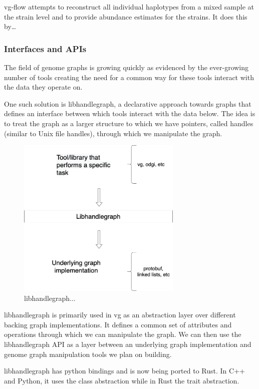 \documentclass[a4paper]{article}
\begin{document}
vg-flow \cite{baaijensStrainawareAssemblyGenomes2020} attempts to reconstruct all 
individual haplotypes from a mixed sample at the strain level and to provide
abundance estimates for the strains. It does this by\ldots{}

\subsubsection{Interfaces and APIs}
\label{sec:org153922e}
The field of genome graphs is growing quickly as evidenced by the ever-growing
number of tools creating the need for a common way for these tools interact with
the data they operate on.

One such solution is libhandlegraph, a declarative approach towards graphs that
defines an interface between which tools interact with the data below. 
The idea is to treat the graph as a larger structure to which we have pointers,
called handles (similar to  Unix file handles), through which we manipulate the
graph. 

\begin{figure}[h]
\centering
\includegraphics[width=0.7\textwidth]{figures/libhandlegraph.png}
\caption{libhandlegraph...}
\end{figure}

libhandlegraph is primarily used in vg as an abstraction layer over different
backing graph implementations.
It defines a common set of attributes and operations through which we can
manipulate the graph. We can then use the libhandlegraph API as a layer between
an underlying graph implementation and genome graph manipulation tools we plan 
on building.

libhandlegraph has python bindings and is now being ported to Rust. In C++ and 
Python, it uses the class abstraction while in Rust the trait abstraction.
\end{document}
